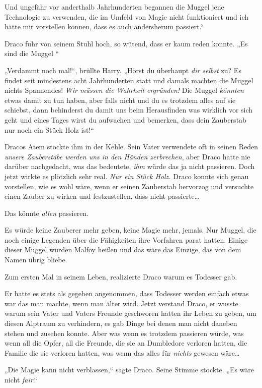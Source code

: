 {Und ungefähr vor anderthalb Jahrhunderten begannen die Muggel jene Technologie zu verwenden, die im Umfeld von Magie nicht funktioniert und ich hätte mir vorstellen können, dass es auch andersherum passiert.“

Draco fuhr von seinem Stuhl hoch, so wütend, dass er kaum reden konnte. „Es sind die Muggel \later“

„Verdammt noch mal!“, brüllte Harry. „Hörst du überhaupt \emph{dir selbst} zu? Es findet seit mindestens acht Jahrhunderten statt und damals machten die Muggel nichts Spannendes! \emph{Wir müssen die Wahrheit} \emph{ergründen!} Die Muggel \emph{könnten} etwas damit zu tun haben, aber falls nicht und du es trotzdem alles auf sie schiebst, dann behinderst du damit uns beim Herausfinden was wirklich vor sich geht und eines Tages wirst du aufwachen und bemerken, dass dein Zauberstab nur noch ein Stück Holz ist!“

Dracos Atem stockte ihm in der Kehle. Sein Vater verwendete oft in seinen Reden \emph{unsere Zauberstäbe werden uns in den Händen zerbrechen}, aber Draco hatte nie darüber nachgedacht, was das bedeutete, \emph{ihm} würde das ja nicht passieren. Doch jetzt wirkte es plötzlich sehr real. \emph{Nur ein Stück Holz.} Draco konnte sich genau vorstellen, wie es wohl wäre, wenn er seinen Zauberstab hervorzog und versuchte einen Zauber zu wirken und festzustellen, dass nicht passierte…

Das könnte \emph{allen} passieren.

Es würde keine Zauberer mehr geben, keine Magie mehr, jemals. Nur Muggel, die noch einige Legenden über die Fähigkeiten ihre Vorfahren parat hatten. Einige dieser Muggel würden Malfoy heißen und das wäre das Einzige, das von dem Namen übrig bliebe.

Zum ersten Mal in seinem Leben, realizierte Draco warum es Todesser gab.

Er hatte es stets als gegeben angenommen, dass Todesser werden einfach etwas war das man machte, wenn man älter wird. Jetzt verstand Draco, er wusste warum sein Vater und Vaters Freunde geschworen hatten ihr Leben zu geben, um diesen Alptraum zu verhindern, es gab Dinge bei denen man nicht daneben stehen und zusehen konnte. Aber was wenn es trotzdem passieren würde, was wenn all die Opfer, all die Freunde, die sie an Dumbledore verloren hatten, die Familie die sie verloren hatten, was wenn das alles für \emph{nichts} gewesen wäre…

„Die Magie kann nicht verblassen,“ sagte Draco. Seine Stimme stockte. „Es wäre nicht \emph{fair}.“

}
